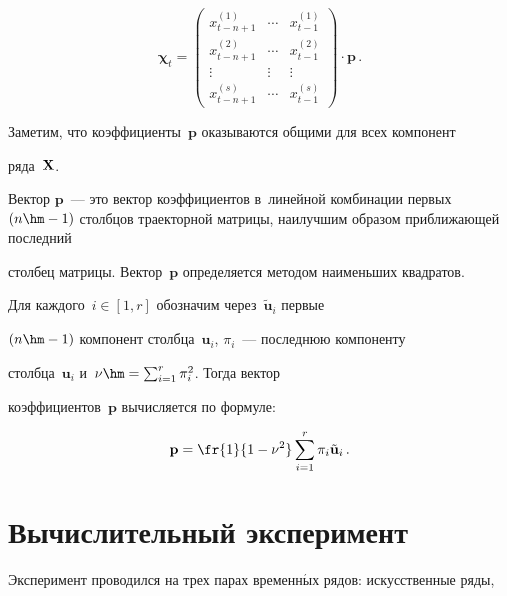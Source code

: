\begin{equation*}

{\bm \chi}_t = \begin{pmatrix}

x^{(1)}_{t - n + 1} & \cdots & x^{(1)}_{t - 1} \\

x^{(2)}_{t - n + 1} & \cdots & x^{(2)}_{t - 1} \\

\vdots&\vdots& \vdots\\

x^{(s)}_{t - n + 1} & \cdots & x^{(s)}_{t - 1}

\end{pmatrix} \cdot \mathbf{p}\,.

\end{equation*}

Заметим, что коэффициенты~$\mathbf{p}$ оказываются общими для всех компонент 

ряда~${\bf X}$.

Вектор  $\mathbf{p}$~--- это вектор коэффициентов в~линейной комбинации первых $(n 

\hm- 1)$ столбцов траекторной матрицы, наилучшим образом приближающей последний 

столбец матрицы. Вектор~$\mathbf{p}$ определяется методом наименьших квадратов.



Для каждого~$i \in [1, r]$ обозначим через~$\tilde{\mathbf{u}}_i$ первые 

$(n \hm- 1)$ компонент столбца~$\mathbf{u}_i$, $\pi_i$~--- последнюю компоненту 

столбца~$\mathbf{u}_i$ и~$\nu \hm = \sum\nolimits_{i = 1}^{r}{\pi_i^2}$. Тогда вектор 

коэффициентов~$\mathbf{p}$ вычисляется по формуле:

\begin{equation*}

\mathbf{p} = \fr{1}{1 - \nu^2}\sum\limits_{i = 1}^{r}{\pi_i\tilde{\mathbf{u}}_i}\,.

\end{equation*}



\section{Вычислительный эксперимент}



Эксперимент проводился на трех парах временн$\acute{\mbox{ы}}$х рядов: искусственные ряды,   

